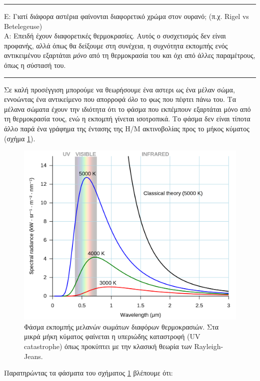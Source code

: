 {\color{red} \hrule}
Ε: Γιατί διάφορα αστέρια φαίνονται διαφορετικό χρώμα στον ουρανό; (π.χ. Rigel vs Betelegeuse)\\
A: Επειδή έχουν διαφορετικές θερμοκρασίες. Αυτός ο συσχετισμός δεν είναι προφανής, αλλά όπως θα δείξουμε στη συνέχεια, η συχνότητα εκπομπής ενός αντικειμένου εξαρτάται \textit{μόνο} από τη θερμοκρασία του και όχι από άλλες παραμέτρους, όπως η σύστασή του.
{\color{red} \hrule}

Σε καλή προσέγγιση μπορούμε να θεωρήσουμε ένα αστερι ως ένα μέλαν σώμα, εννοώντας ένα αντικείμενο που απορροφά \textit{όλο} το φως που πέφτει πάνω του. Τα μέλανα σώματα έχουν την ιδιότητα ότι το {\color{blue} φάσμα που εκπέμπουν εξαρτάται μόνο από τη θερμοκρασία τους, ενώ η εκπομπή γίνεται ισοτροπικά}. Το φάσμα δεν είναι τίποτα άλλο παρά ένα γράφημα της έντασης της Η/Μ ακτινοβολίας προς το μήκος κύματος (σχήμα \ref{fig:black_body_spectrum}).

\begin{figure}[h]
    \centering
    \includegraphics[width=\linewidth]{Figures/black_body_spectrum.png}
    \caption{Φάσμα εκπομπής μελανών σωμάτων διαφόρων θερμοκρασιών. Στα μικρά μήκη κύματος φαίνεται η υπεριώδης καταστροφή (UV catastrophe) όπως προκύπτει με την κλασική θεωρία των Rayleigh-Jeans.}
    \label{fig:black_body_spectrum}
\end{figure}

Παρατηρώντας τα φάσματα του σχήματος \ref{fig:black_body_spectrum} βλέπουμε ότι:

